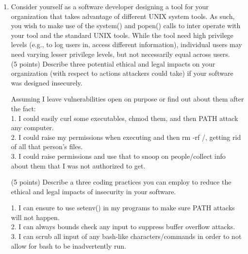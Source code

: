 \documentclass{article}[9pt]
\newenvironment{myanswer}{\begin{mdframed}\begin{answerfont}}{\end{answerfont}\end{mdframed}}
\begin{document}
\begin{enumerate}
\item Consider yourself as a software developer designing a tool for your
organization that takes advantage of different UNIX system tools. As such,
you wish to make use of the system() and popen() calls to inter
operate with your tool and the standard UNIX tools. While the tool need
high privilege levels (e.g., to log users in, access different
information), individual users may need varying lesser privilege levels,
but not necessarily equal across users.\\
(5 points) Describe three potential ethical and legal impacts on your
organization (with respect to actions attackers could take) if your software was
designed insecurely.
\begin{myanswer}
Assuming I leave vulnerabilities open on purpose or find out about them
after the fact: \\
1. I could easily curl some executables, chmod them, and then PATH
attack any computer.\\
2. I could raise my permissions when executing and then rm -rf /,
getting rid of all that person's files.\\
3. I could raise permissions and use that to snoop on people/collect
info about them that I was not authorized to get.
\end{myanswer}
(5 points) Describe a three coding practices you can employ to reduce the ethical
and legal impacts of insecurity in your software.
\begin{myanswer}
1. I can ensure to use setenv() in my programs to make sure PATH attacks
will not happen.\\
2. I can always bounds check any input to suppress buffer overflow
attacks.\\
3. I can scrub all input of any bash-like characters/commands in order
to not allow for bash to be inadvertently run.
\end{myanswer}
\end{enumerate}
\end{document}
